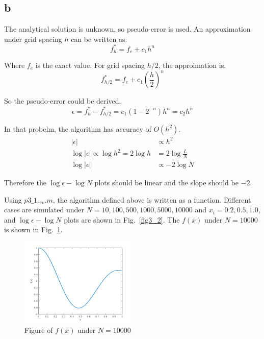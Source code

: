 \documentclass[letterpaper,10pt]{article}
\begin{document}
\subsection{b}
The analytical solution is unknown, so pseudo-error is used. An approximation under 
grid spacing $h$ can be written as:
\begin{equation*}
  f^*_h=f_e+c_1h^n
\end{equation*}

Where $f_e$ is the exact value. For grid spacing $h/2$, the approimation is, 
\begin{equation*}
  f^*_{h/2}=f_e+c_1\left(\frac{h}{2}\right)^n
\end{equation*}

So the pseudo-error could be derived. 
\begin{equation*}
  \epsilon = f^*_h-f^*_{h/2}=c_1\left(1-2^{-n}\right)h^n=c_2h^n
\end{equation*}

In that probelm, the algorithm has accuracy of $O\left(h^2\right)$. 
\begin{align*}
  |\epsilon|&\propto h^2\\
  \log |\epsilon| \propto \log h^2= 2\log h &= 2\log \frac{L}{N}\\
  \log |\epsilon| &\propto -2 \log N
\end{align*}

Therefore the $\log \epsilon-\log N$ plots should be linear and the slope should be $-2$. 

Using $p3\_1_{rev}.m$, the algorithm defined above is written as a function. Different cases are 
simulated under $N=10,100,500,1000,5000,10000$ and $x_i=0.2,0.5,1.0$, and $\log \epsilon-\log N$ plots are shown in Fig.~\ref{fig3_2}. 
The $f(x)$ under $N=10000$ is shown in Fig.~\ref{fig3_1}. 

\begin{figure}[h]
  \centering
  \includegraphics[width=0.5\textwidth]{p3_1.png}
  \caption{Figure of $f(x)$ under $N=10000$}
  \label{fig3_1}
\end{figure}
\end{document}

